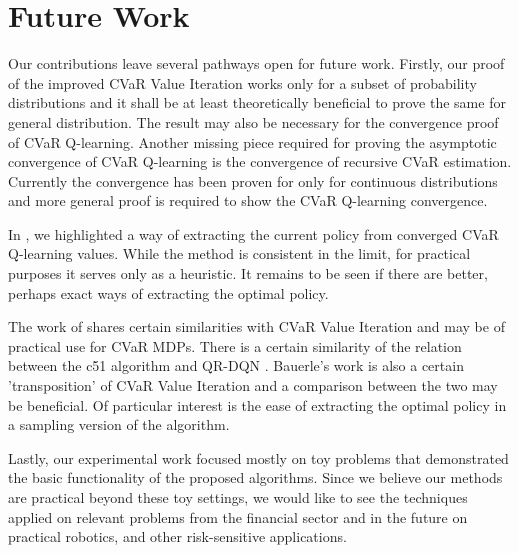 
\section{Future Work}

Our contributions leave several pathways open for future work. Firstly, our proof of the improved CVaR Value Iteration works only for a subset of probability distributions and it shall be at least theoretically beneficial to prove the same for general distribution. The result may also be necessary for the convergence proof of CVaR Q-learning. Another missing piece required for proving the asymptotic convergence of CVaR Q-learning is the convergence of recursive CVaR estimation. Currently the convergence has been proven for only for continuous distributions and more general proof is required to show the CVaR Q-learning convergence.

In , we highlighted a way of extracting the current policy from converged CVaR Q-learning values. While the method is consistent in the limit, for practical purposes it serves only as a heuristic. It remains to be seen if there are better, perhaps exact ways of extracting the optimal policy.

The work of \citet{bauerle2011markov} shares certain similarities with CVaR Value Iteration and may be of practical use for CVaR MDPs. There is a certain similarity of the relation between the c51 algorithm \citep{bellemare2017distributional} and QR-DQN \citep{dabney2017distributional}. Bauerle's work is also a certain 'transposition' of CVaR Value Iteration and a comparison between the two may be beneficial. Of particular interest is the ease of extracting the optimal policy in a sampling version of the algorithm.

Lastly, our experimental work focused mostly on toy problems that demonstrated the basic functionality of the proposed algorithms. Since we believe our methods are practical beyond these toy settings, we would like to see the techniques applied on relevant problems from the financial sector and in the future on practical robotics, and other risk-sensitive applications.


